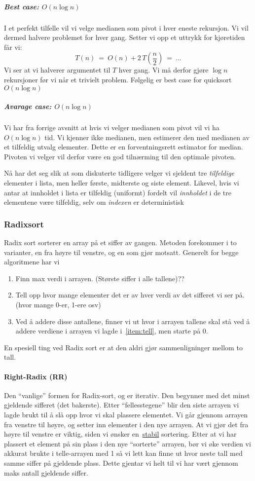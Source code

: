 \subparagraph{Best case: $ O(n\log n) $}
I et perfekt tilfelle vil vi velge medianen som pivot i hver eneste rekursjon. Vi vil dermed halvere problemet for hver gang. Setter vi opp et uttrykk for kjøretiden får vi:
\[ T(n) ~=~ O(n) + 2\,T\left( \frac{n}{2} \right) ~=~ ... \]
Vi ser at vi halverer argumentet til $ T $ hver gang. Vi må derfor gjøre $ \log n $ rekursjoner før vi når et trivielt problem. Følgelig er best case for quicksort $ O(n\log n) $

\subparagraph{Avarage case: $ O(n\log n) $}
Vi har fra forrige avsnitt at hvis vi velger medianen som pivot vil vi ha $ O(n\log n) $ tid.  Vi kjenner ikke medianen, men estimerer den med medianen av et tilfeldig utvalg elementer. Dette er en forventningsrett estimator for median. Pivoten vi velger vil derfor være en god tilnærming til den optimale pivoten. 

Nå har det seg slik at som diskuterte tidligere velger vi sjeldent tre \emph{tilfeldige} elementer i lista, men heller første, midterste og siste element. Likevel, hvis vi antar at innholdet i lista er tilfeldig (uniformt) fordelt vil \emph{innholdet} i de tre elementene være tilfeldig, selv om \emph{indexen} er deterministisk



\subsubsection{\color{red}Radixsort}\label{radixsort}
Radix sort sorterer en array på et siffer av gangen.
Metoden forekommer i to varianter, en fra høyre til venstre, og en som gjør
motsatt. Generelt for begge algoritmene har vi
\begin{enumerate}
\item Finn max verdi i arrayen. (Største siffer i alle tallene)\color{red}??
\item\label{item:tell} Tell opp hvor mange elementer det er av hver verdi av det sifferet vi ser
  på. (hvor mange 0-er, 1-ere osv)
\item Ved å addere disse antallene, finner vi ut hvor i arrayen tallene skal stå
  ved å addere verdiene i arrayen vi lagde i~\ref{item:tell}, men starte på 0.
\end{enumerate}
En spesiell ting ved Radix sort er at den aldri gjør sammenligninger mellom to
tall.

\paragraph{\color{red}Right-Radix (RR)}
Den ``vanlige'' formen for Radix-sort, og er iterativ.
Den begynner med det minst gjeldende sifferet (det bakerste). Etter
``fellesstegene'' blir den siste arrayen vi lagde brukt til å slå opp hvor vi
skal plassere elementet. Vi går gjennom arrayen fra venstre til høyre, og setter
inn elementer i den nye arrayen. At vi gjør det fra høyre til venstre er viktig,
siden vi ønsker en~\hyperref[stabil]{stabil} sortering. Etter at vi har plassert
et element på sin plass i den nye ``sorterte'' arrayen, bør vi øke verdien vi
akkurat brukte i telle-arrayen med 1 så vi lett kan finne ut hvor neste tall med
samme siffer på gjeldende plass. Dette gjentar vi helt til vi har vært gjennom
maks antall gjeldende siffer.


